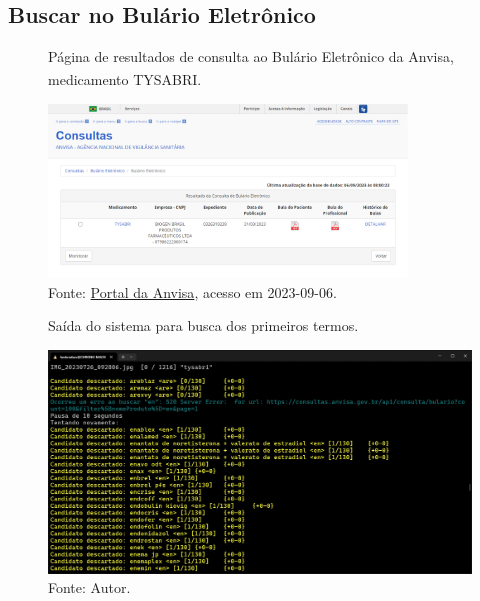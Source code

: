 \subsection{Buscar no Bulário Eletrônico}
\begin{frame}
    \begin{figure}
		\centering
		\caption*{Página de resultados de consulta ao Bulário Eletrônico da Anvisa, medicamento TYSABRI\textsuperscript{\small\textregistered}.}
        \includegraphics[width=0.85\textwidth]{../pictures/bulario_resultado.png}
        \caption*{Fonte: \href{https://consultas.Anvisa.gov.br/\#/bulario/q/?nomeProduto=TYSABRI}{Portal da Anvisa}, acesso em 2023-09-06.}
    \end{figure}
\end{frame}

\begin{frame}
    \begin{figure}
        \centering
        \caption*{Saída do sistema para busca dos primeiros termos.}
        \includegraphics[height=0.72\textheight]{../pictures/terminal tysabri busca 1.jpg}
        \caption*{Fonte: Autor.}
    \end{figure}
\end{frame}

